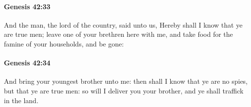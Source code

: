 		\paragraph{Genesis 42:33} %
			\label{GENESIS-42-33}

			And the man, the lord of the country, said unto us, Hereby shall I know that ye are true men; leave one of your brethren here with me, and take food for the famine of your households, and be gone:


		\paragraph{Genesis 42:34} %
			\label{GENESIS-42-34}

			And bring your youngest brother unto me: then shall I know that ye are no spies, but that ye are true men: so will I deliver you your brother, and ye shall traffick in the land.



